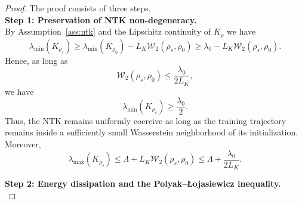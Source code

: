 \documentclass[10pt,a4paper]{amsart}
\newcommand{\Wass}{\mathcal{W}}
\begin{document}
\begin{proof} The proof consists of three steps. \\ 
{\bf Step 1: Preservation of NTK non-degeneracy.}\\
By Assumption~\ref{ass:ntk} and the Lipschitz continuity of $K_\rho$ we have 
\[
\lambda_{\min}(K_{\rho_s})
\ge
\lambda_{\min}(K_{\rho_0})
-
L_K
\Wass_2(\rho_s,\rho_0) \geq \lambda_0 - L_K
\Wass_2(\rho_s,\rho_0). 
\]
Hence, as long as 
\[
\Wass_2(\rho_s,\rho_0)
\le
\frac{\lambda_0}{2L_K},
\]
we have
\[
\lambda_{\min}(K_{\rho_s})
\ge
\frac{\lambda_0}{2}.
\]
Thus, the NTK remains uniformly coercive as long as the training trajectory remains inside a sufficiently small Wasserstein neighborhood of its initialization. Moreover,
$$
\lambda_{\max}(K_{\rho_s}) \leq \Lambda +L_K
\Wass_2(\rho_s,\rho_0) \leq \Lambda + \frac{\lambda_0}{2L_K}. 
$$

{\bf Step 2: Energy dissipation and the Polyak–Łojasiewicz inequality.} \\ 


\end{proof}
\end{document}
